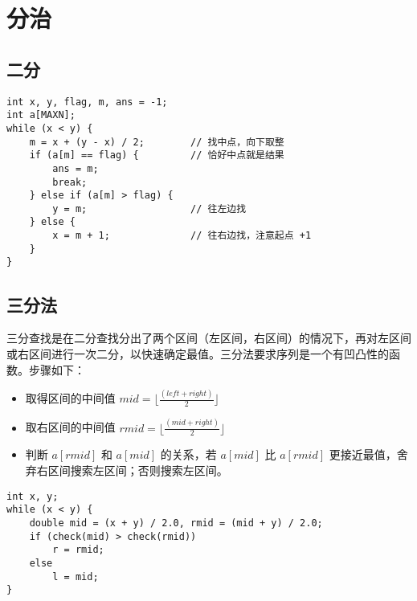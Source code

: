 \section{分治}
\subsection{二分}
\begin{verbatim}
int x, y, flag, m, ans = -1;
int a[MAXN];
while (x < y) {
    m = x + (y - x) / 2;        // 找中点，向下取整
    if (a[m] == flag) {         // 恰好中点就是结果
        ans = m;
        break;
    } else if (a[m] > flag) {
        y = m;                  // 往左边找
    } else {
        x = m + 1;              // 往右边找，注意起点 +1
    }
}
\end{verbatim}

\subsection{三分法}
\noindent \par 三分查找是在二分查找分出了两个区间（左区间，右区间）的情况下，再对左区间或右区间进行一次二分，以快速确定最值。三分法要求序列是一个有凹凸性的函数。步骤如下：

\begin{itemize}
    \item 取得区间的中间值 $mid = \lfloor \frac{(left + right)}{2} \rfloor$
    \item 取右区间的中间值 $rmid = \lfloor \frac{(mid + right)}{2} \rfloor$
    \item 判断 $a[rmid]$ 和 $a[mid]$ 的关系，若 $a[mid]$ 比 $a[rmid]$ 更接近最值，舍弃右区间搜索左区间；否则搜索左区间。
\end{itemize}

\begin{verbatim}
int x, y;
while (x < y) {
    double mid = (x + y) / 2.0, rmid = (mid + y) / 2.0;
    if (check(mid) > check(rmid))
        r = rmid;
    else
        l = mid;
}
\end{verbatim}

